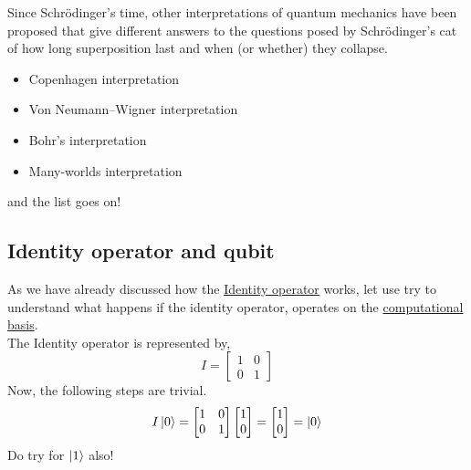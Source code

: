 \documentclass{article}
\begin{document}
Since Schrödinger's time, other interpretations of quantum mechanics have been proposed that give different answers to the questions posed by Schrödinger's cat of how long superposition last and when (or whether) they collapse. 
\begin{itemize}
    \item  Copenhagen interpretation
    \item Von Neumann–Wigner interpretation
    \item Bohr's interpretation
    \item  Many-worlds interpretation
\end{itemize}
and the list goes on!
\subsection{Identity operator and qubit}
\label{subsec:Identity operator and qubit}
As we have already discussed how the \hyperref[subsec:Identity Operator]{Identity operator} works, let use try to understand what happens if the identity operator, operates on the \hyperref[subsec: Special States]{computational basis}.\\
The Identity operator is represented by,
\begin{equation}
    I = \begin{bmatrix}
        1 & 0 \\ 0 & 1
    \end{bmatrix}
\end{equation}
Now, the following steps are trivial.
\begin{equation}
    I\ket{0} = \begin{bmatrix}
        1 & 0 \\ 0 & 1
    \end{bmatrix}\begin{bmatrix}
        1 \\ 0
    \end{bmatrix} = \begin{bmatrix}
        1 \\ 0
    \end{bmatrix} = \ket{0}    
\end{equation}
Do try for $\ket{1}$ also!
\end{document}
